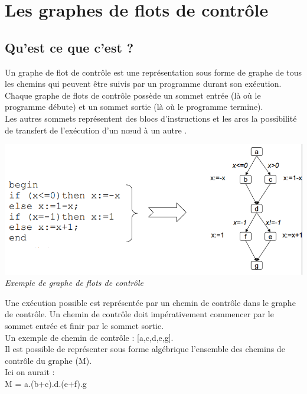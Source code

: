 \documentclass[a4paper,twoside,12pt,openright]{report}
\begin{document}
\newpage

\section{Les graphes de flots de contrôle}
\subsection{Qu'est ce que c'est ?}
Un graphe de flot de contrôle est une représentation sous forme de graphe de tous les chemins qui peuvent être suivis par un programme durant son exécution.\\
Chaque graphe de flots de contrôle possède un sommet entrée (là où le programme débute) et un sommet sortie (là où le programme termine).\\
Les autres sommets représentent des blocs d'instructions et les arcs la possibilité de transfert de l'exécution d'un nœud à un autre \cite{ref11}.

\begin{center}
\includegraphics[scale=0.7]{Image/GFC.png}\\
\itshape{Exemple de graphe de flots de contrôle\cite{ref11}}
\end{center}

Une exécution possible est représentée par un chemin de contrôle dans le graphe de contrôle. Un chemin de contrôle doit impérativement commencer par le sommet entrée et finir par le sommet sortie.\\
Un exemple de chemin de contrôle : [a,c,d,e,g].\\
Il est possible de représenter sous forme algébrique l'ensemble des chemins de contrôle du graphe (M).\\
Ici on aurait :\\
M = a.(b+c).d.(e+f).g\\
\end{document}

